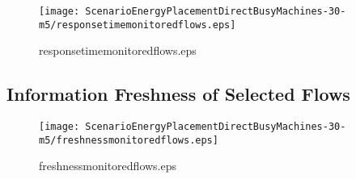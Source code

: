 \documentclass{elsart}
\begin{document}
\begin{figure}[ht]
\centering
\texttt{[image: ScenarioEnergyPlacementDirectBusyMachines-30-m5/responsetimemonitoredflows.eps]}
\caption{responsetimemonitoredflows.eps}\label{fig:responsetimemonitoredflows}
\end{figure}

\clearpage
\subsection{Information Freshness of Selected Flows}

\begin{figure}[ht]
\centering
\texttt{[image: ScenarioEnergyPlacementDirectBusyMachines-30-m5/freshnessmonitoredflows.eps]}
\caption{freshnessmonitoredflows.eps}\label{fig:freshnessmonitoredflows}
\end{figure}

\clearpage
\end{document}
